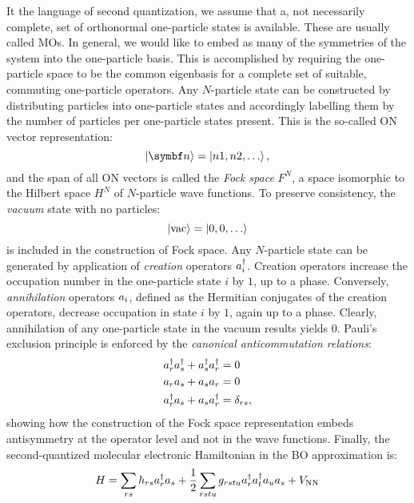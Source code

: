 It the language of second quantization, we assume that a, not
necessarily complete, set of orthonormal one-particle states is
available. These are usually called \glspl{MO}.
In general, we would like to embed as many of the symmetries of the
system into the one-particle basis. This is accomplished by requiring
the one-particle space to be the common eigenbasis for a complete set of
suitable, commuting one-particle operators.\autocite{Gross1991-hi}
Any $N$-particle state can be constructed by distributing particles
into one-particle states and accordingly labelling them by the number of
particles per one-particle states present.
This is the so-called \gls{ON} vector representation:
\begin{equation}
  \ket{\vect{n}} = \ket{n1,n2,\ldots},
\end{equation}
and the span of all \acrshort{ON} vectors is called the \emph{Fock
space} $F^N$, a space isomorphic to the Hilbert space $H^N$ of
$N$-particle wave functions.
To preserve consistency, the \emph{vacuum} state with no particles:
\begin{equation}
 \ket{\mathrm{vac}} = \ket{0,0,\ldots}
\end{equation}
is included in the construction of Fock space.
Any $N$-particle state can be generated by application of
\emph{creation} operators $a_{i}^{\dagger}$. Creation operators increase the
occupation number in the one-particle state $i$ by $1$, up to a phase.
Conversely, \emph{annihilation} operators $a_{i}$, defined as the Hermitian
conjugates of the creation operators, decrease occupation in state $i$
by $1$, again up to a phase. Clearly, annihilation of any one-particle
state in the vacuum results yields $0$.
Pauli's exclusion principle is enforced by the \emph{canonical
anticommutation relations}:
\begin{subequations}
  \begin{align}
    a_{r}^{\dagger}a_{s}^{\dagger} + a_{s}^{\dagger}a_{r}^{\dagger} &= 0 \\
    a_{r}a_{s} + a_{s}a_{r} &= 0 \\
    a_{r}^{\dagger}a_{s} + a_{s}a_{r}^{\dagger} &= \delta_{rs},
  \end{align}
\end{subequations}
showing how the construction of the Fock space representation
embeds antisymmetry at the operator level and not in the wave functions.
Finally, the second-quantized molecular electronic Hamiltonian in the \acrlong{BO}
approximation is:\autocite{Helgaker2000-tz, Shavitt2009-mr}
\begin{equation}\label{eq:sq-hamiltonian}
  H = \sum_{rs}h_{rs}a_{r}^{\dagger}a_{s}
  + \frac{1}{2}\sum_{rstu}g_{rstu}a_{r}^{\dagger}a_{t}^{\dagger}a_{u}a_{s}
  + V_\mathrm{NN}
\end{equation}
